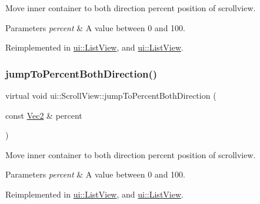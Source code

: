 Move inner container to both direction percent position of scrollview. 
\begin{DoxyParams}{Parameters}
{\em percent} & A value between 0 and 100. \\
\hline
\end{DoxyParams}


Reimplemented in \hyperlink{classui_1_1ListView_ad6bbe89fde987d1bb2ead8de0bc688b5}{ui\+::\+List\+View}, and \hyperlink{classui_1_1ListView_aeb683b8f4eb94d0f22d78c0652bd331a}{ui\+::\+List\+View}.

\mbox{\label{classui_1_1ScrollView_a88b2ab06319ea3892829cf14f5a8c89b}} 
\subsubsection{\texorpdfstring{jump\+To\+Percent\+Both\+Direction()}{jumpToPercentBothDirection()}\hspace{0.1cm}{\footnotesize\ttfamily [2/2]}}
{\footnotesize\ttfamily virtual void ui\+::\+Scroll\+View\+::jump\+To\+Percent\+Both\+Direction (\begin{DoxyParamCaption}\item[{const \hyperlink{classVec2}{Vec2} \&}]{percent }\end{DoxyParamCaption})\hspace{0.3cm}{\ttfamily [virtual]}}

Move inner container to both direction percent position of scrollview. 
\begin{DoxyParams}{Parameters}
{\em percent} & A value between 0 and 100. \\
\hline
\end{DoxyParams}


Reimplemented in \hyperlink{classui_1_1ListView_ad6bbe89fde987d1bb2ead8de0bc688b5}{ui\+::\+List\+View}, and \hyperlink{classui_1_1ListView_aeb683b8f4eb94d0f22d78c0652bd331a}{ui\+::\+List\+View}.

\mbox{\label{classui_1_1ScrollView_ab3816071846ac5c8d4b5b4ae3c3ee5a5}} 
